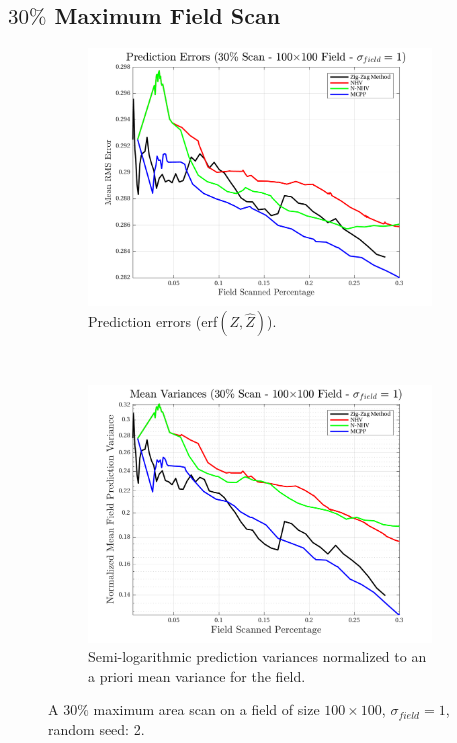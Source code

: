 \FloatBarrier
\clearpage
\subsection{$30\%$ Maximum Field Scan}
\begin{figure}[htb!]
    \centering
    \begin{subfigure}[t]{0.65\textwidth}
        \centering
        \includegraphics[width=\linewidth]{figures/hbresults/pred_errs_30p_100x100_sf_1_seed_2.png}
        \captionsetup{skip=0.20\baselineskip,size=footnotesize}
        \caption{Prediction errors (erf$(Z,\hat{Z})$).}
        \label{fig:prederrs_sigma1_p30_s2}
    \end{subfigure}%
    \\
    \begin{subfigure}[t]{0.65\textwidth}
        \centering
        \includegraphics[width=\linewidth]{figures/hbresults/vars_30p_100x100_sf_1_seed_2.png}
        \captionsetup{skip=0.20\baselineskip,size=footnotesize}
        \caption{Semi-logarithmic prediction variances normalized to an a priori mean variance for the field.}
        \label{fig:prederrs_sigma1_p30_s2}
    \end{subfigure}
    \captionsetup{skip=0.20\baselineskip}
    \caption{A $30\%$ maximum area scan on a field of size $100 \times 100$, $\sigma_{field} = 1$, random seed: 2.}
    \label{fig:sigma1_p30_s2}
\end{figure}

